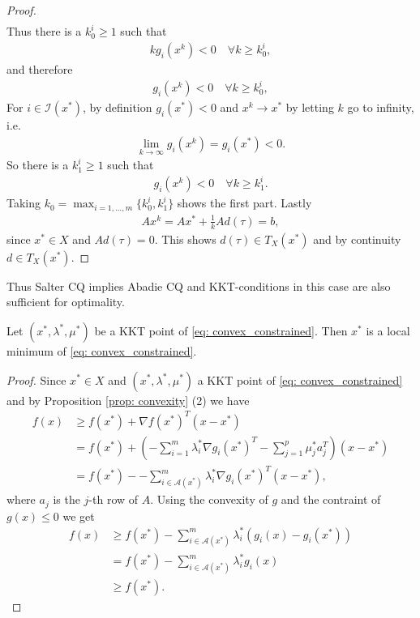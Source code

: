 \begin{proof}
\begin{align}
\end{align}
Thus there is a $k^i_0\ge1$ such that
\begin{align}
    kg_i(x^{k}) < 0 \quad \forall k \ge k_0^{i},
\end{align}
and therefore
\begin{align}
    g_i(x^{k}) < 0 \quad \forall k \ge k_0^{i},
\end{align}
For $i \in \mathcal{I}(x^{*})$, by definition $g_i(x^{*}) < 0$ and $x^{k} \to
x^{*}$ by letting $k$ go to infinity, i.e.
\begin{align}
    \lim_{k \to \infty} g_i(x^{k}) = g_i (x^{*}) < 0.
\end{align}
So there is a $k_1^{i} \ge 1$ such that
\begin{align}
    g_i(x^{k}) < 0 \quad \forall k \ge k_1^{i}.
\end{align}
Taking $k_0 = \max_{i=1,\ldots,m}\{k_0^{i} , k_1^{i}\}$
shows the first part. Lastly
\begin{align}
    Ax^{k} = A x^{*}  + \frac{1}{k}Ad(\tau) = b,
\end{align}
since $x^{*} \in X$ and $Ad(\tau) = 0$. This shows $d(\tau) \in T_X(x^{*})$
and by continuity $d \in T_X(x^{*})$.
\end{proof}
Thus Salter CQ implies Abadie CQ and KKT-conditions in this case
are also sufficient for optimality.
\begin{theorem}
    Let $(x^{*}, \lambda^{*},\mu^{*})$ be a KKT point of
    \ref{eq: convex_constrained}. Then $x^{*}$ is a local minimum of
    \ref{eq: convex_constrained}.
\end{theorem}
\begin{proof}
    Since $x^{*} \in X$ and $(x^{*}, \lambda^{*}, \mu^{*})$ a KKT point of
    \ref{eq: convex_constrained} and by Proposition \ref{prop: convexity} (2)
    we have
    \begin{align}
        f(x)
        &\ge f(x^{*}) + \nabla f(x^{*})^{T}(x-x^{*})\\
        &= f(x^{*}) + \left(
        -\sum_{i=1}^{m} \lambda_i^{*}\nabla g_i(x^{*})^{T}
        -\sum_{j=1}^{p} \mu_j^{*} a_j^{T}
    \right)(x-x^{*})\\
        &= f(x^{*}) -
        -\sum_{i\in\mathcal{A}(x^{*})}^{m} \lambda_i^{*}\nabla g_i(x^{*})^{T}
    (x-x^{*}),
    \end{align}
    where $a_j$ is the $j$-th row of $A$. Using the convexity of $g$ and the
    contraint of $g(x) \le 0$ we get
    \begin{align}
        f(x)
        &\ge f(x^{*})
        -\sum_{i\in\mathcal{A}(x^{*})}^{m} \lambda_i^{*}
        \left( g_i(x) -g_i(x^{*})  \right)\\
        &= f(x^{*})
        -\sum_{i\in\mathcal{A}(x^{*})}^{m} \lambda_i^{*}
        g_i(x)\\
        &\ge f(x^{*}).
    \end{align}
\end{proof}


